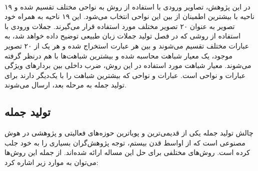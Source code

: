 \begin{enumerate}
\\
در این پژوهش، تصاویر ورودی با استفاده از روش  به نواحی مختلف تقسیم شده و ۱۹ ناحیه با بیشترین اطمینان از بین این نواحی انتخاب می‌شود. این ۱۹ ناحیه به همراه خود تصویر به عنوان ۲۰ تصویر مختلف مورد استفاده قرار می‌گیرند. جملات ورودی با استفاده از روشی که در فصل تولید جملات زبان طبیعی توضیح داده خواهد شد، به عبارات مختلف تقسیم می‌شوند و بین هر عبارت استخراج شده و هر یک از ۲۰ تصویر موجود، یک معیار شباهت محاسبه شده و بیشترین شباهت‌ها با هم درنظر گرفته می‌شوند. معیار شباهت مورد استفاده در این روش، ضرب داخلی بین بردارهای ویژگی عبارات و نواحی است. عبارات و نواحی که بیشترین شباهت را با یک‌دیگر دارند برای تولید جمله به مرحله بعد، ارسال می‌شوند.
\end{enumerate}

\subsection{تولید جمله}
چالش تولید جمله یکی از قدیمی‌ترین و پویاترین حوزه‌های فعالیتی و پژوهشی در هوش مصنوعی است که از اواسط قدن بیستم، توجه پژوهش‌گران بسیاری را به خود جلب کرده است. روش‌های مختلفی برای حل این مساله ارائه شده‌اند. از جمله این روش‌ها می‌توان به موارد زیر اشاره کرد:


